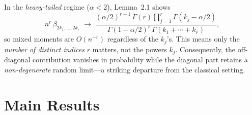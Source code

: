 \documentclass[11pt,a4paper]{article}
\theoremstyle{definition}
\begin{document}
In the \emph{heavy-tailed} regime ($\alpha<2$), Lemma~2.1 shows
\[
  n^r\,\beta_{2k_1,\dots,2k_r}\;\longrightarrow\;
  \frac{(\alpha/2)^{r-1}\,\Gamma(r)\prod_{j=1}^r\Gamma(k_j-\alpha/2)}
  {\Gamma(1-\alpha/2)^r\,\Gamma(k_1+\cdots+k_r)},
\]
so mixed moments are $O(n^{-r})$ regardless of the $k_j$'s.  This means only the \emph{number of distinct indices} $r$ matters, not the powers $k_j$.  Consequently, the off-diagonal contribution vanishes in probability while the diagonal part retains a \emph{non-degenerate} random limit---a striking departure from the classical setting.

\section{Main Results}
\end{document}
